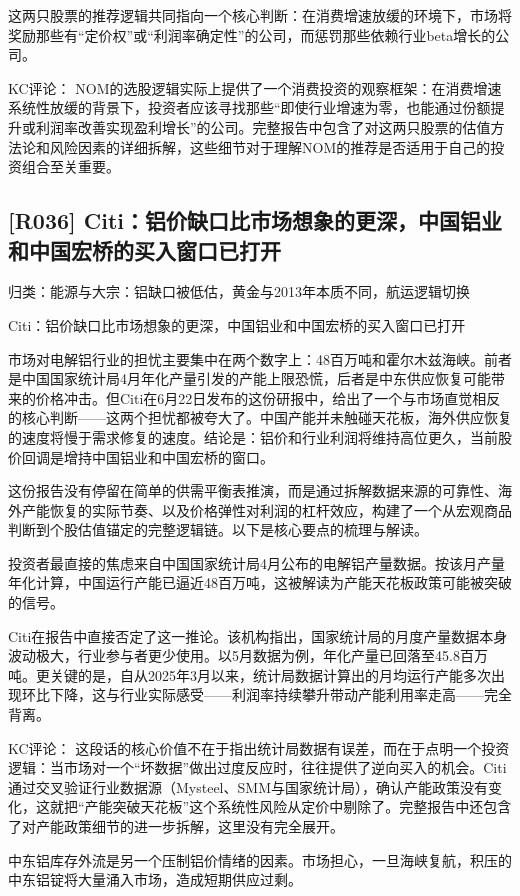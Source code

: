 \documentclass[11pt]{ctexart}
\begin{document}
这两只股票的推荐逻辑共同指向一个核心判断：在消费增速放缓的环境下，市场将奖励那些有“定价权”或“利润率确定性”的公司，而惩罚那些依赖行业beta增长的公司。

KC评论： NOM的选股逻辑实际上提供了一个消费投资的观察框架：在消费增速系统性放缓的背景下，投资者应该寻找那些“即使行业增速为零，也能通过份额提升或利润率改善实现盈利增长”的公司。完整报告中包含了对这两只股票的估值方法论和风险因素的详细拆解，这些细节对于理解NOM的推荐是否适用于自己的投资组合至关重要。

\subsection{[R036] Citi：铝价缺口比市场想象的更深，中国铝业和中国宏桥的买入窗口已打开}
{\small\color{refgray}归类：能源与大宗：铝缺口被低估，黄金与2013年本质不同，航运逻辑切换}

Citi：铝价缺口比市场想象的更深，中国铝业和中国宏桥的买入窗口已打开

市场对电解铝行业的担忧主要集中在两个数字上：48百万吨和霍尔木兹海峡。前者是中国国家统计局4月年化产量引发的产能上限恐慌，后者是中东供应恢复可能带来的价格冲击。但Citi在6月22日发布的这份研报中，给出了一个与市场直觉相反的核心判断——这两个担忧都被夸大了。中国产能并未触碰天花板，海外供应恢复的速度将慢于需求修复的速度。结论是：铝价和行业利润将维持高位更久，当前股价回调是增持中国铝业和中国宏桥的窗口。

这份报告没有停留在简单的供需平衡表推演，而是通过拆解数据来源的可靠性、海外产能恢复的实际节奏、以及价格弹性对利润的杠杆效应，构建了一个从宏观商品判断到个股估值锚定的完整逻辑链。以下是核心要点的梳理与解读。

投资者最直接的焦虑来自中国国家统计局4月公布的电解铝产量数据。按该月产量年化计算，中国运行产能已逼近48百万吨，这被解读为产能天花板政策可能被突破的信号。

Citi在报告中直接否定了这一推论。该机构指出，国家统计局的月度产量数据本身波动极大，行业参与者更少使用。以5月数据为例，年化产量已回落至45.8百万吨。更关键的是，自从2025年3月以来，统计局数据计算出的月均运行产能多次出现环比下降，这与行业实际感受——利润率持续攀升带动产能利用率走高——完全背离。

KC评论： 这段话的核心价值不在于指出统计局数据有误差，而在于点明一个投资逻辑：当市场对一个“坏数据”做出过度反应时，往往提供了逆向买入的机会。Citi通过交叉验证行业数据源（Mysteel、SMM与国家统计局），确认产能政策没有变化，这就把“产能突破天花板”这个系统性风险从定价中剔除了。完整报告中还包含了对产能政策细节的进一步拆解，这里没有完全展开。

中东铝库存外流是另一个压制铝价情绪的因素。市场担心，一旦海峡复航，积压的中东铝锭将大量涌入市场，造成短期供应过剩。
\end{document}
